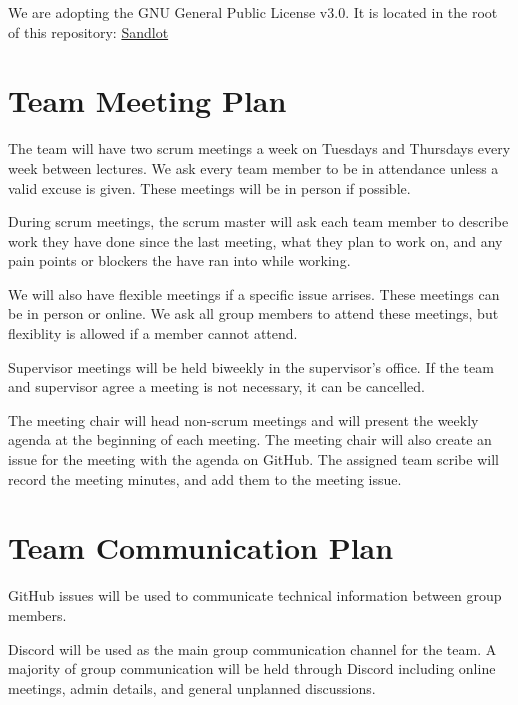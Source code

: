 \documentclass{article}
\begin{document}
We are adopting the GNU General Public License v3.0. It is located 
in the root of this repository: \href{https://github.com/Nicholas-Fabugais-Inaba/Sandlot/blob/main/LICENSE}{Sandlot}

\section{Team Meeting Plan}

The team will have two scrum meetings a week on Tuesdays and Thursdays every week
between lectures. We ask every team member to be in attendance unless a valid
excuse is given. These meetings will be in person if possible.\newline

During scrum meetings, the scrum master will ask each team member to describe
work they have done since the last meeting, what they plan to work on, and any
pain points or blockers the have ran into while working.\newline

We will also have flexible meetings if a specific issue arrises. These meetings can be in
person or online. We ask all group members to attend these meetings, but
flexiblity is allowed if a member cannot attend.\newline

Supervisor meetings will be held biweekly in the supervisor's office. If the
team and supervisor agree a meeting is not necessary, it can be cancelled.
\newline

The meeting chair will head non-scrum meetings and will present the weekly
agenda at the beginning of each meeting. The meeting chair will also create an
issue for the meeting with the agenda on GitHub. The assigned team scribe will
record the meeting minutes, and add them to the meeting issue.

\section{Team Communication Plan}

GitHub issues will be used to communicate technical information 
between group members.\newline

Discord will be used as the main group communication channel for the team. A majority 
of group communication will be held through Discord including online meetings, admin details, 
and general unplanned discussions.\newline
\end{document}
